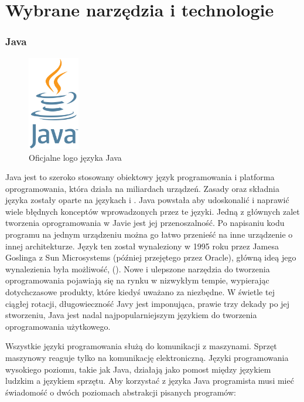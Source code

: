 \chapter{Wybrane narzędzia i technologie}



\subsection{Java}

\begin{figure}[!htbp]
    \centering
    \includegraphics[width=0.2\textwidth]{images/javaLogo.png}
    \caption{Oficjalne logo języka Java}
    \label{fig:enter-label}
\end{figure}

Java jest to szeroko stosowany obiektowy język programowania i platforma oprogramowania, która działa na miliardach urządzeń. Zasady oraz składnia języka zostały oparte na językach  i . Java powstała aby udoskonalić i naprawić wiele błędnych konceptów wprowadzonych przez te języki. Jedną z głównych zalet tworzenia oprogramowania w Javie jest jej przenoszalność. Po napisaniu kodu programu na jednym urządzeniu można go łatwo przenieść na inne urządzenie o innej architekturze. Język ten został wynaleziony w 1995 roku przez Jamesa Goslinga z Sun Microsystems (później przejętego przez Oracle), główną ideą jego wynalezienia była możliwość,   (). Nowe i ulepszone narzędzia do tworzenia oprogramowania pojawiają się na rynku w nizwykłym tempie, wypierając dotychczasowe produkty, które kiedyś uważano za niezbędne. W świetle tej ciągłej rotacji, długowieczność Javy jest imponująca, prawie trzy dekady po jej stworzeniu, Java jest nadal najpopularniejszym językiem do tworzenia oprogramowania użytkowego\cite{javaIBM}\cite{javaDEV}.

Wszystkie języki programowania służą do komunikacji z maszynami. Sprzęt maszynowy reaguje tylko na komunikację elektroniczną. Języki programowania wysokiego poziomu, takie jak Java, działają jako pomost między językiem ludzkim a językiem sprzętu. Aby korzystać z języka Java programista musi mieć świadomość o dwóch poziomach abstrakcji pisanych programów: 

